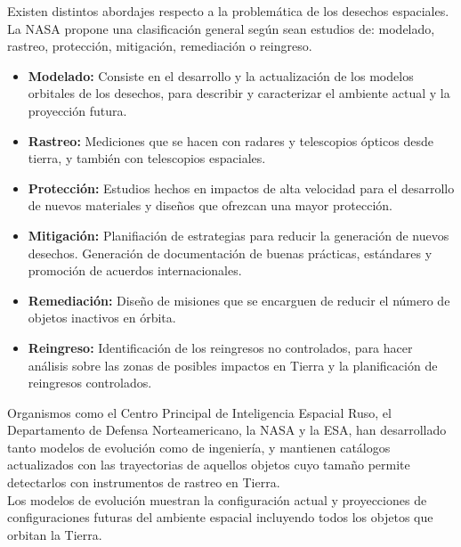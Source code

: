 Existen distintos abordajes respecto a la problem\'atica de los desechos espaciales. La \ac{NASA} propone una clasificaci\'on general seg\'un sean estudios de: modelado, rastreo, protecci\'on, mitigaci\'on, remediaci\'on o reingreso.\\
\begin{itemize}
\item {\bf{Modelado:}} Consiste en el desarrollo y la actualizaci\'on de los modelos orbitales de los desechos, para describir y caracterizar el ambiente actual y la proyecci\'on futura.\\
\item {\bf{Rastreo:}} Mediciones que se hacen con radares y telescopios \'opticos desde tierra, y tambi\'en con telescopios espaciales.\\
\item {\bf{Protecci\'on:}} Estudios hechos en impactos de alta velocidad para el desarrollo de nuevos materiales y dise\~nos que ofrezcan una mayor protecci\'on.\\
\item {\bf{Mitigaci\'on:}} Planifiaci\'on de estrategias para reducir la generaci\'on de nuevos desechos. Generaci\'on de documentaci\'on  de buenas pr\'acticas, est\'andares y promoci\'on de acuerdos internacionales.\\
\item {\bf{Remediaci\'on:}} Dise\~no de misiones que se encarguen de reducir el n\'umero de objetos inactivos en \'orbita.\\
\item {\bf{Reingreso:}} Identificaci\'on de los reingresos no controlados, para hacer an\'alisis sobre las zonas de posibles impactos en Tierra y la planificaci\'on de reingresos controlados.\\
\end{itemize}

Organismos como el Centro Principal de Inteligencia Espacial Ruso, el Departamento de Defensa Norteamericano, la NASA y la \ac{ESA}, han desarrollado tanto modelos de evoluci\'on como de ingenier\'ia, y mantienen cat\'alogos actualizados con las trayectorias de aquellos objetos cuyo tama\~no permite detectarlos con instrumentos de rastreo en Tierra.\\

Los modelos de evoluci\'on muestran la configuraci\'on actual y proyecciones de configuraciones futuras del ambiente espacial incluyendo todos los objetos que orbitan la Tierra.\\

